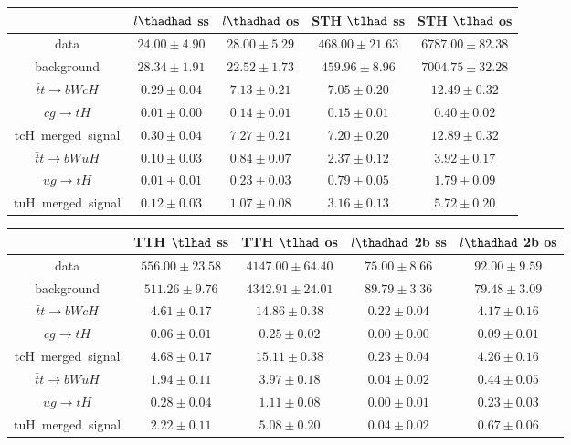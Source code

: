 \centering
\begin{tabular}{|c|c|c|c|c|} \hline
 & $l\thadhad$ ss & $l\thadhad$ os & STH $\tlhad$ ss & STH $\tlhad$ os\\\hline
data & $24.00\pm4.90$ & $28.00\pm5.29$ & $468.00\pm21.63$ & $6787.00\pm82.38$\\\hline
background & $28.34\pm1.91$ & $22.52\pm1.73$ & $459.96\pm8.96$ & $7004.75\pm32.28$\\\hline
$\bar{t}t\to bWcH$ & $0.29\pm0.04$ & $7.13\pm0.21$ & $7.05\pm0.20$ & $12.49\pm0.32$\\\hline
$cg\to tH$ & $0.01\pm0.00$ & $0.14\pm0.01$ & $0.15\pm0.01$ & $0.40\pm0.02$\\\hline
tcH~merged~signal & $0.30\pm0.04$ & $7.27\pm0.21$ & $7.20\pm0.20$ & $12.89\pm0.32$\\\hline
$\bar{t}t\to bWuH$ & $0.10\pm0.03$ & $0.84\pm0.07$ & $2.37\pm0.12$ & $3.92\pm0.17$\\\hline
$ug\to tH$ & $0.01\pm0.01$ & $0.23\pm0.03$ & $0.79\pm0.05$ & $1.79\pm0.09$\\\hline
tuH~merged~signal & $0.12\pm0.03$ & $1.07\pm0.08$ & $3.16\pm0.13$ & $5.72\pm0.20$\\\hline
\end{tabular}
\begin{tabular}{|c|c|c|c|c|} \hline
 & TTH $\tlhad$ ss & TTH $\tlhad$ os & $l\thadhad$ 2b ss & $l\thadhad$ 2b os\\\hline
data & $556.00\pm23.58$ & $4147.00\pm64.40$ & $75.00\pm8.66$ & $92.00\pm9.59$\\\hline
background & $511.26\pm9.76$ & $4342.91\pm24.01$ & $89.79\pm3.36$ & $79.48\pm3.09$\\\hline
$\bar{t}t\to bWcH$ & $4.61\pm0.17$ & $14.86\pm0.38$ & $0.22\pm0.04$ & $4.17\pm0.16$\\\hline
$cg\to tH$ & $0.06\pm0.01$ & $0.25\pm0.02$ & $0.00\pm0.00$ & $0.09\pm0.01$\\\hline
tcH~merged~signal & $4.68\pm0.17$ & $15.11\pm0.38$ & $0.23\pm0.04$ & $4.26\pm0.16$\\\hline
$\bar{t}t\to bWuH$ & $1.94\pm0.11$ & $3.97\pm0.18$ & $0.04\pm0.02$ & $0.44\pm0.05$\\\hline
$ug\to tH$ & $0.28\pm0.04$ & $1.11\pm0.08$ & $0.00\pm0.01$ & $0.23\pm0.03$\\\hline
tuH~merged~signal & $2.22\pm0.11$ & $5.08\pm0.20$ & $0.04\pm0.02$ & $0.67\pm0.06$\\\hline
\end{tabular}
